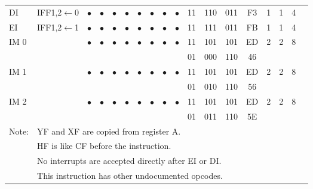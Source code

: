 \documentclass[oneside,a4paper]{book}
\begin{document}
{\begin{tabular}{llcccccccccccccccl}
		DI\footnotemark[3]\instrt & 
			IFF1,2$\leftarrow$0 & 
			$\bullet$ & 
				$\bullet$ & 
				$\bullet$ & 
				$\bullet$ & 
				$\bullet$ & 
				$\bullet$ &
				$\bullet$ & 
				$\bullet$ &
			11 & 110 & 011 & 
			F3 & 1 & 
			1 & 4 & \instrb \\

		EI\footnotemark[3]\instrt & 
			IFF1,2$\leftarrow$1 & 
			$\bullet$ & 
				$\bullet$ & 
				$\bullet$ & 
				$\bullet$ & 
				$\bullet$ & 
				$\bullet$ & 
				$\bullet$ & 
				$\bullet$ &
			11 & 111 & 011 & 
			FB & 1 & 
			1 & 4 & \instrb \\

		IM 0\footnotemark[4]\instrt & & 
			$\bullet$ & $
				\bullet$ & 
				$\bullet$ & 
				$\bullet$ & 
				$\bullet$ & 
				$\bullet$ & 
				$\bullet$ & 
				$\bullet$ &
			11 & 101 & 101 & 
			ED & 2 & 
			2 & 8 & \\
		\multicolumn{10}{c}{} & 01 & 000 & 110 & 46 & \instrb \\

		IM 1\footnotemark[4]\instrt & & 
			$\bullet$ & 
				$\bullet$ & 
				$\bullet$ & 
				$\bullet$ & 
				$\bullet$ & 
				$\bullet$ & 
				$\bullet$ & 
				$\bullet$ &
			11 & 101 & 101 & 
			ED & 2 & 
			2 & 8 & \\
		\multicolumn{10}{c}{} & 01 & 010 & 110 & 56 & \instrb \\

		IM 2\footnotemark[4]\instrt & & 
			$\bullet$ & 
				$\bullet$ & 
				$\bullet$ & 
				$\bullet$ & 
				$\bullet$ & 
				$\bullet$ & 
				$\bullet$ & 
				$\bullet$ &
			11 & 101 & 101 & 
			ED & 2 & 
			2 & 8 & \\
		\multicolumn{10}{c}{} & 01 & 011 & 110 & 5E & \instrb \\
		
		\hline

		Note: 
			& \multicolumn{17}{l}{\parbox{12cm}{\footnotemark[1]YF and XF are copied from register A.}}\notet \\
			& \multicolumn{17}{l}{\parbox{12cm}{\footnotemark[2]HF is like CF before the instruction.}} \\
			& \multicolumn{17}{l}{\parbox{12cm}{\footnotemark[3]No interrupts are accepted directly after EI or DI.}} \\
			& \multicolumn{17}{l}{\parbox{12cm}{\footnotemark[4]This instruction has other undocumented opcodes.}}\noteb \\ 
	  
	\hline

	\end{tabular}
}
\end{document}
